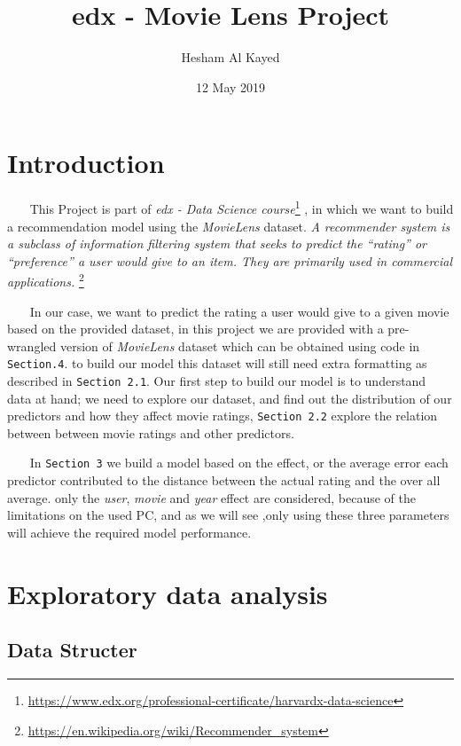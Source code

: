 \documentclass[]{article}
\title{edx - Movie Lens Project}
\author{Hesham Al Kayed}
\date{12 May 2019}
\let\rmarkdownfootnote\footnote%
\def\footnote{\protect\rmarkdownfootnote}
\begin{document}
\maketitle

\section{Introduction}\label{introduction}

~~~ This Project is part of \emph{edx - Data Science course}\footnote{\url{https://www.edx.org/professional-certificate/harvardx-data-science}}
, in which we want to build a recommendation model using the
\emph{MovieLens} dataset. \emph{A recommender system is a subclass of
information filtering system that seeks to predict the ``rating'' or
``preference'' a user would give to an item. They are primarily used in
commercial applications.} \footnote{\url{https://en.wikipedia.org/wiki/Recommender_system}}

~~~ In our case, we want to predict the rating a user would give to a
given movie based on the provided dataset, in this project we are
provided with a pre-wrangled version of \emph{MovieLens} dataset which
can be obtained using code in \texttt{Section.4}. to build our model
this dataset will still need extra formatting as described in
\texttt{Section\ 2.1}. Our first step to build our model is to
understand data at hand; we need to explore our dataset, and find out
the distribution of our predictors and how they affect movie ratings,
\texttt{Section\ 2.2} explore the relation between between movie ratings
and other predictors.

~~~ In \texttt{Section\ 3} we build a model based on the effect, or the
average error each predictor contributed to the distance between the
actual rating and the over all average. only the \emph{user},
\emph{movie} and \emph{year} effect are considered, because of the
limitations on the used PC, and as we will see ,only using these three
parameters will achieve the required model performance.

\section{Exploratory data analysis}\label{exploratory-data-analysis}

\subsection{Data Structer}\label{data-structer}
\end{document}
